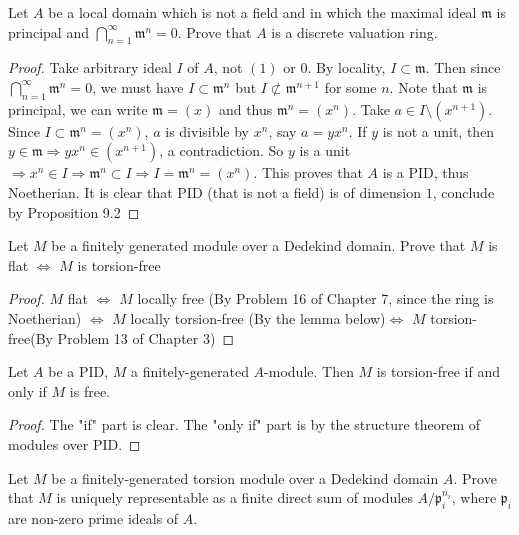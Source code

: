 \documentclass{solution}
\begin{document}
\begin{problem}
    Let $A$ be a local domain which is not a field and in which the maximal ideal $\mathfrak{m}$ is principal and $\bigcap\limits_{n = 1}^{\infty} \mathfrak{m}^n = 0$. Prove that $A$ is a discrete valuation ring.
\end{problem}

\begin{proof}
    Take arbitrary ideal $I$ of $A$, not $(1)$ or $0$. By locality, $I \subset \mathfrak{m}$. Then since $\bigcap\limits_{n = 1}^{\infty} \mathfrak{m}^n = 0$, we must have $I \subset \mathfrak{m}^n$ but $I \not \subset \mathfrak{m}^{n + 1}$ for some $n$. Note that $\mathfrak{m}$ is principal, we can write $\mathfrak{m} = (x)$ and thus $\mathfrak{m}^n = (x^n)$. Take $a \in I \setminus (x^{n + 1})$. Since $I \subset \mathfrak{m}^n = (x^n)$, $a$ is divisible by $x^n$, say $a = yx^n$. If $y$ is not a unit, then $y \in \mathfrak{m} \Rightarrow yx^n \in (x^{n + 1})$, a contradiction. So $y$ is a unit $\Rightarrow x^n \in I \Rightarrow \mathfrak{m}^n \subset I \Rightarrow I = \mathfrak{m}^n = (x^n)$. This proves that $A$ is a PID, thus Noetherian. It is clear that PID (that is not a field) is of dimension $1$, conclude by Proposition 9.2
\end{proof}

\begin{problem}
    Let $M$ be a finitely generated module over a Dedekind domain. Prove that $M$ is flat $\Leftrightarrow$ $M$ is torsion-free
\end{problem}

\begin{proof}
    $M$ flat $\Leftrightarrow$ $M$ locally free (By Problem 16 of Chapter 7, since the ring is Noetherian) $\Leftrightarrow$ $M$ locally torsion-free (By the lemma below)$\Leftrightarrow$ $M$ torsion-free(By Problem 13 of Chapter 3)
\end{proof}

\begin{lemma}
    Let $A$ be a PID, $M$ a finitely-generated $A$-module. Then $M$ is torsion-free if and only if $M$ is free.
\end{lemma}

\begin{proof}
    The "if" part is clear. The "only if" part is by the structure theorem of modules over PID.
\end{proof}

\begin{problem}
    Let $M$ be a finitely-generated torsion module over a Dedekind domain $A$. Prove that $M$ is uniquely representable as a finite direct sum of modules $A / \mathfrak{p}_i^{n_i}$, where $\mathfrak{p}_i$ are non-zero prime ideals of $A$.
\end{problem}
\end{document}
